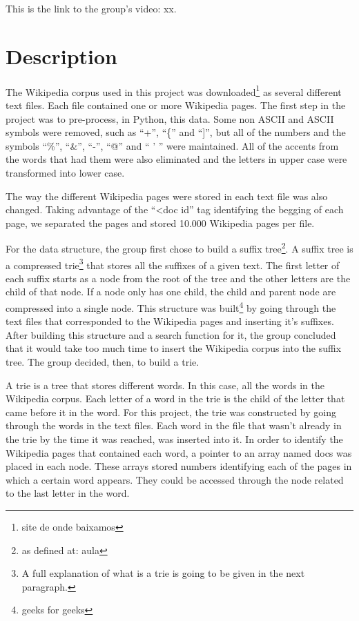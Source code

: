 \documentclass{article}
\begin{document}
This is the link to the group's video: xx. 

\section*{Description}
The Wikipedia corpus used in this project was downloaded\footnote{site de onde baixamos}  as several different text files. Each file contained one or more Wikipedia pages. The first step in the project was to pre-process, in Python, this data. Some non ASCII and ASCII symbols were removed, such as ``+'', ``\{'' and ``]'', but all of the numbers and the symbols ``\%'', ``\&'', ``-'', ``@'' and `` ' '' were maintained. All of the accents from the words that had them were also eliminated and the letters in upper case were transformed into lower case. 

The way the different Wikipedia pages were stored in each text file was also changed. Taking advantage of the ``<doc id'' tag identifying the begging of each page, we separated the pages and stored 10.000 Wikipedia pages per file. 

For the data structure, the group first chose to build a suffix tree\footnote{as defined at: aula}. A suffix tree is a compressed trie\footnote{A full explanation of what is a trie is going to be given in the next paragraph.} that stores all the suffixes of a given text. The first letter of each suffix starts as a node from the root of the tree and the other letters are the child of that node. If a node only has one child, the child and parent node are compressed into a single node. This structure was built\footnote{geeks for geeks} by going through the text files that corresponded to the Wikipedia pages and inserting it's suffixes. After building this structure and a search function for it, the group concluded that it would take too much time to insert the Wikipedia corpus into the suffix tree. The group decided, then, to build a trie. 

A trie is a tree that stores different words. In this case, all the words in the Wikipedia corpus. Each letter of a word in the trie is the child of the letter that came before it in the word. 
For this project, the trie was constructed by going through the words in the text files. Each word in the file that wasn't already in the trie by the time it was reached, was inserted into it. In order to identify the Wikipedia pages that contained each word, a pointer to an array named docs was placed in each node. These arrays stored numbers identifying each of the pages in which a certain word appears. They could be accessed through the node related to the last letter in the word. 
\end{document}

